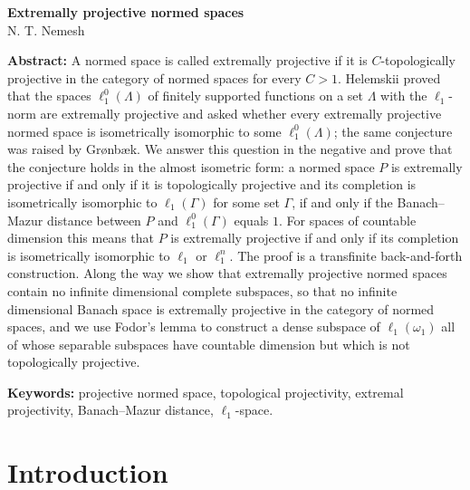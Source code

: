 \documentclass[12pt]{article}
\newcommand{\lo}[1]{\ell_1^0(#1)}
\newcommand{\ellone}[1]{\ell_1(#1)}
\begin{document}
\begin{center}
    \Large \textbf{Extremally projective normed spaces}\\[0.5cm]
    \small {N. T. Nemesh}\\[0.5cm]
\end{center}

\thispagestyle{empty}

\medskip
\textbf{Abstract:} A normed space is called extremally projective if it is
$C$-topologically projective in the category of normed spaces for every $C>1$.
Helemskii proved that the spaces $\lo{\Lambda}$ of finitely supported functions
on a set $\Lambda$ with the $\ell_1$-norm are extremally projective and asked
whether every extremally projective normed space is isometrically isomorphic to
some $\lo{\Lambda}$; the same conjecture was raised by Gr{\o}nb{\ae}k. We answer
this question in the negative and prove that the conjecture holds in the
almost isometric form: a normed space $P$ is extremally projective if and only
if it is topologically projective and its completion is isometrically
isomorphic to $\ellone{\Gamma}$ for some set $\Gamma$, if and only if the
Banach--Mazur distance between $P$ and $\lo{\Gamma}$ equals $1$. For spaces of
countable dimension this means that $P$ is extremally projective if and only
if its completion is isometrically isomorphic to $\ell_1$ or $\ell_1^n$. The
proof is a transfinite back-and-forth construction. Along the way we show that
extremally projective normed spaces contain no infinite dimensional complete
subspaces, so that no infinite dimensional Banach space is extremally
projective in the category of normed spaces, and we use Fodor's lemma to
construct a dense subspace of $\ellone{\omega_1}$ all of whose separable
subspaces have countable dimension but which is not topologically projective.
\medskip

\textbf{Keywords:} projective normed space, topological projectivity, extremal
projectivity, Banach--Mazur distance, $\ell_1$-space.

\bigskip


\section{Introduction}\label{SectionIntroduction}
\end{document}
